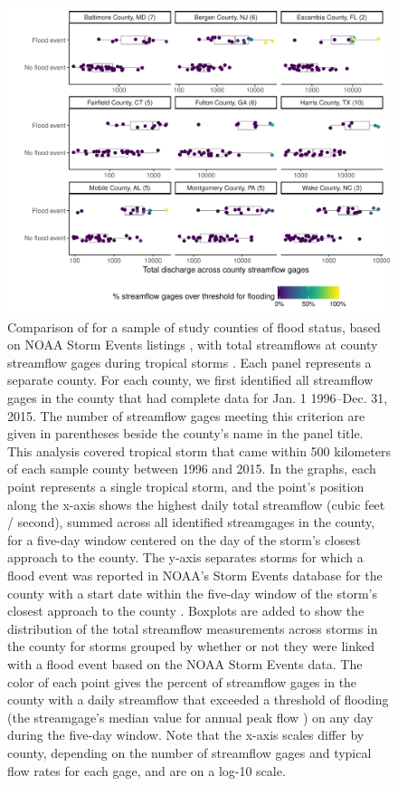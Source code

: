 \documentclass[fleqn,10pt,lineno]{olplainarticle}
\begin{document}
\begin{figure}[tbhp!]
\centering
\includegraphics[width=0.8\linewidth]{figures/floodcomparison}
\caption{Comparison of for a sample of study counties of flood status, based on NOAA Storm Events listings \cite{stormevents, noaastormevents}, with total streamflows at county streamflow gages during tropical storms \cite{usgsgages, countyfloods, dataRetrieval}. Each panel represents a separate county. For each county, we first identified all streamflow gages in the county that had complete data for Jan. 1 1996--Dec. 31, 2015. The number of streamflow gages meeting this criterion are given in parentheses beside the county's name in the panel title. This analysis covered tropical storm that came within 500 kilometers of each sample county between 1996 and 2015. In the graphs, each point represents a single tropical storm, and the point's position along the x-axis shows the highest daily total streamflow (cubic feet / second), summed across all identified streamgages in the county, for a five-day window centered on the day of the storm's closest approach to the county. The y-axis separates storms for which a flood event was reported in NOAA's Storm Events database for the county with a start date within the five-day window of the storm's closest approach to the county \cite{stormevents, noaastormevents}. Boxplots are added to show the distribution of the total streamflow measurements across storms in the county for storms grouped by whether or not they were linked with a flood event based on the NOAA Storm Events data. The color of each point gives the percent of streamflow gages in the county with a daily streamflow that exceeded a threshold of flooding (the streamgage's median value for annual peak flow \cite{countyfloods}) on any day during the five-day window.  Note that the x-axis scales differ by county, depending on the number of streamflow gages and typical flow rates for each gage, and are on a log-10 scale.}
\label{fig:floodcomparison}
\end{figure}
\end{document}
